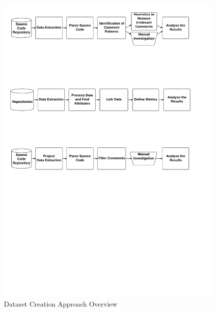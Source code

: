 \begin{figure}[thb!]
  \centering
  \includegraphics[width=1\textwidth]{figures/chapter3/approach.pdf}
  \caption{Dataset Creation Approach Overview}
  \label{chap3:fig:approach}
\end{figure}

